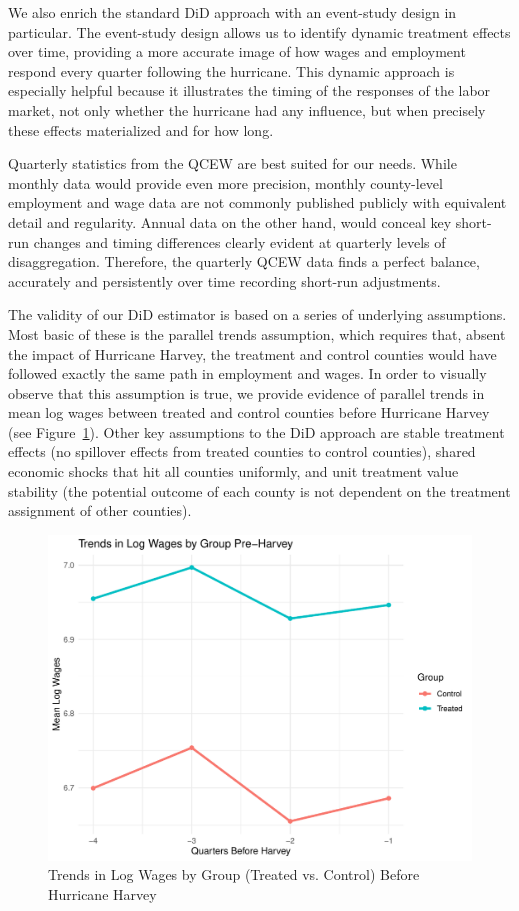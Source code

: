 \documentclass{article}
\begin{document}
We also enrich the standard DiD approach with an event-study design in particular. The event-study design allows us to identify dynamic treatment effects over time, providing a more accurate image of how wages and employment respond every quarter following the hurricane. This dynamic approach is especially helpful because it illustrates the timing of the responses of the labor market, not only whether the hurricane had any influence, but when precisely these effects materialized and for how long.

Quarterly statistics from the QCEW are best suited for our needs. While monthly data would provide even more precision, monthly county-level employment and wage data are not commonly published publicly with equivalent detail and regularity. Annual data on the other hand, would conceal key short-run changes and timing differences clearly evident at quarterly levels of disaggregation. Therefore, the quarterly QCEW data finds a perfect balance, accurately and persistently over time recording short-run adjustments.

The validity of our DiD estimator is based on a series of underlying assumptions. Most basic of these is the parallel trends assumption, which requires that, absent the impact of Hurricane Harvey, the treatment and control counties would have followed exactly the same path in employment and wages. In order to visually observe that this assumption is true, we provide evidence of parallel trends in mean log wages between treated and control counties before Hurricane Harvey (see Figure~\ref{fig:pre_trends}). Other key assumptions to the DiD approach are stable treatment effects (no spillover effects from treated counties to control counties), shared economic shocks that hit all counties uniformly, and unit treatment value stability (the potential outcome of each county is not dependent on the treatment assignment of other counties).

\begin{figure}[H]
    \centering
    \includegraphics[width=0.9\linewidth]{Rplot06.pdf}
    \caption{Trends in Log Wages by Group (Treated vs. Control) Before Hurricane Harvey}
    \label{fig:pre_trends}
\end{figure}
\end{document}
